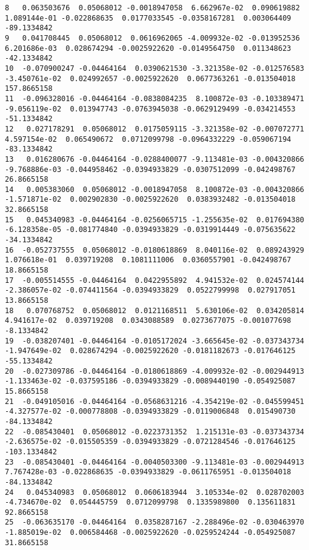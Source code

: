 \documentclass[15pt,a4paper,openright]{article}
\begin{document}
\begin{lstlisting}[language=AMPL, caption = data file]
8   0.063503676  0.05068012 -0.0018947058  6.662967e-02  0.090619882  1.089144e-01 -0.022868635  0.0177033545 -0.0358167281  0.003064409  -89.1334842
9   0.041708445  0.05068012  0.0616962065 -4.009932e-02 -0.013952536  6.201686e-03  0.028674294 -0.0025922620 -0.0149564750  0.011348623  -42.1334842
10  -0.070900247 -0.04464164  0.0390621530 -3.321358e-02 -0.012576583 -3.450761e-02  0.024992657 -0.0025922620  0.0677363261 -0.013504018  157.8665158
11  -0.096328016 -0.04464164 -0.0838084235  8.100872e-03 -0.103389471 -9.056119e-02  0.013947743 -0.0763945038 -0.0629129499 -0.034214553  -51.1334842
12   0.027178291  0.05068012  0.0175059115 -3.321358e-02 -0.007072771  4.597154e-02  0.065490672  0.0712099798 -0.0964332229 -0.059067194  -83.1334842
13   0.016280676 -0.04464164 -0.0288400077 -9.113481e-03 -0.004320866 -9.768886e-03 -0.044958462 -0.0394933829 -0.0307512099 -0.042498767   26.8665158
14   0.005383060  0.05068012 -0.0018947058  8.100872e-03 -0.004320866 -1.571871e-02  0.002902830 -0.0025922620  0.0383932482 -0.013504018   32.8665158
15   0.045340983 -0.04464164 -0.0256065715 -1.255635e-02  0.017694380 -6.128358e-05 -0.081774840 -0.0394933829 -0.0319914449 -0.075635622  -34.1334842
16  -0.052737555  0.05068012 -0.0180618869  8.040116e-02  0.089243929  1.076618e-01  0.039719208  0.1081111006  0.0360557901 -0.042498767   18.8665158
17  -0.005514555 -0.04464164  0.0422955892  4.941532e-02  0.024574144 -2.386057e-02 -0.074411564 -0.0394933829  0.0522799998  0.027917051   13.8665158
18   0.070768752  0.05068012  0.0121168511  5.630106e-02  0.034205814  4.941617e-02  0.039719208  0.0343088589  0.0273677075 -0.001077698   -8.1334842
19  -0.038207401 -0.04464164 -0.0105172024 -3.665645e-02 -0.037343734 -1.947649e-02  0.028674294 -0.0025922620 -0.0181182673 -0.017646125  -55.1334842
20  -0.027309786 -0.04464164 -0.0180618869 -4.009932e-02 -0.002944913 -1.133463e-02 -0.037595186 -0.0394933829 -0.0089440190 -0.054925087   15.8665158
21  -0.049105016 -0.04464164 -0.0568631216 -4.354219e-02 -0.045599451 -4.327577e-02 -0.000778808 -0.0394933829 -0.0119006848  0.015490730  -84.1334842
22  -0.085430401  0.05068012 -0.0223731352  1.215131e-03 -0.037343734 -2.636575e-02 -0.015505359 -0.0394933829 -0.0721284546 -0.017646125 -103.1334842
23  -0.085430401 -0.04464164 -0.0040503300 -9.113481e-03 -0.002944913  7.767428e-03 -0.022868635 -0.0394933829 -0.0611765951 -0.013504018  -84.1334842
24   0.045340983  0.05068012  0.0606183944  3.105334e-02  0.028702003 -4.734670e-02  0.054445759  0.0712099798  0.1335989800  0.135611831   92.8665158
25  -0.063635170 -0.04464164  0.0358287167 -2.288496e-02 -0.030463970 -1.885019e-02  0.006584468 -0.0025922620 -0.0259524244 -0.054925087   31.8665158

\end{lstlisting}
\end{document}
